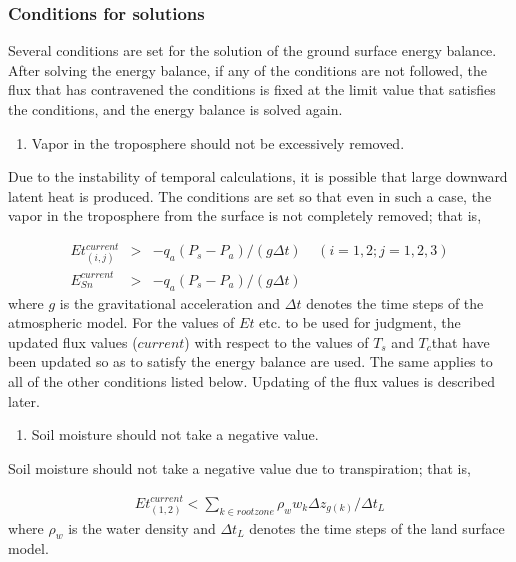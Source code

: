 \subsubsection{Conditions for solutions}\label{conditions-for-solutions}

Several conditions are set for the solution of the ground surface energy balance. After solving the energy balance, if any of the conditions are not followed, the flux that has contravened the
conditions is fixed at the limit value that satisfies the conditions, and the energy balance is solved again.

\begin{enumerate}
\def\labelenumi{\arabic{enumi}.}
\tightlist
\item
  Vapor in the troposphere should not be excessively removed.
\end{enumerate}

Due to the instability of temporal calculations, it is possible that large downward latent heat is produced. The conditions are set so that even in such a case, the vapor in the troposphere from the
surface is not completely removed; that is,

\begin{eqnarray}
  Et_{(i,j)}^{current} &>& - q_a ( P_s - P_a ) / (g \Delta t)
   \ \ \ \ \ (i=1,2 ; j=1,2,3) \\
  E_{Sn}^{current} &>& - q_a ( P_s - P_a ) / (g \Delta t)
\end{eqnarray} where \(g\) is the gravitational acceleration and \(\Delta t\) denotes the time steps of the atmospheric model. For the values of \(Et\) etc. to be used for judgment, the updated flux values
(\(current\)) with respect to the values of \(T_s\) and \(T_c\)that have been updated so as to satisfy the energy balance are used. The same applies to all of the other conditions listed below.
Updating of the flux values is described later.

\begin{enumerate}
\def\labelenumi{\arabic{enumi}.}
\setcounter{enumi}{1}
\tightlist
\item
  Soil moisture should not take a negative value.
\end{enumerate}

Soil moisture should not take a negative value due to transpiration; that is,

\begin{eqnarray}
   Et_{(1,2)}^{current} <
     \sum_{k\in rootzone} \rho_w w_{k}\Delta z_{g(k)} /\Delta t_L
\end{eqnarray} where \(\rho_w\) is the water density and \(\Delta t_L\) denotes the time steps of the land surface model.


